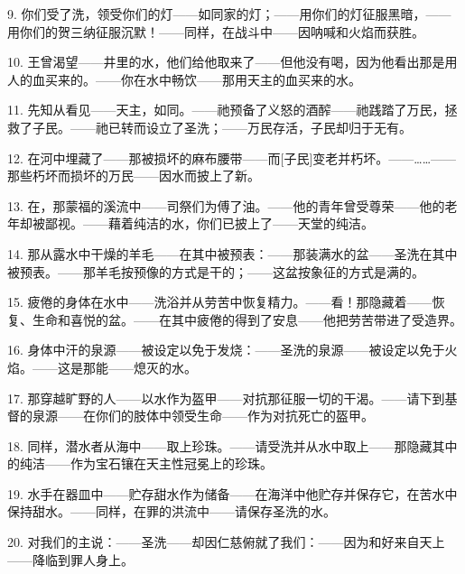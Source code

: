 9. 你们受了洗，领受你们的灯——如同家的灯；——用你们的灯征服黑暗，——用你们的贺三纳征服沉默！——同样，在战斗中——因呐喊和火焰而获胜。\par

10. 王曾渴望——井里的水，他们给他取来了——但他没有喝，因为他看出那是用人的血买来的。——你在水中畅饮——那用天主的血买来的水。\par

11. 先知从看见——天主，如同。——祂预备了义怒的酒醡——祂践踏了万民，拯救了子民。——祂已转而设立了圣洗；——万民存活，子民却归于无有。\par

12. 在河中埋藏了——那被损坏的麻布腰带——而[子民]变老并朽坏。——……——那些朽坏而损坏的万民——因水而披上了新。\par

13. 在，那蒙福的溪流中——司祭们为傅了油。——他的青年曾受尊荣——他的老年却被鄙视。——藉着纯洁的水，你们已披上了——天堂的纯洁。\par

14. 那从露水中干燥的羊毛——在其中被预表：——那装满水的盆——圣洗在其中被预表。——那羊毛按预像的方式是干的；——这盆按象征的方式是满的。\par

15. 疲倦的身体在水中——洗浴并从劳苦中恢复精力。——看！那隐藏着——恢复、生命和喜悦的盆。——在其中疲倦的得到了安息——他把劳苦带进了受造界。\par

16. 身体中汗的泉源——被设定以免于发烧：——圣洗的泉源——被设定以免于火焰。——这是那能——熄灭的水。\par

17. 那穿越旷野的人——以水作为盔甲——对抗那征服一切的干渴。——请下到基督的泉源——在你们的肢体中领受生命——作为对抗死亡的盔甲。\par

18. 同样，潜水者从海中——取上珍珠。——请受洗并从水中取上——那隐藏其中的纯洁——作为宝石镶在天主性冠冕上的珍珠。\par

19. 水手在器皿中——贮存甜水作为储备——在海洋中他贮存并保存它，在苦水中保持甜水。——同样，在罪的洪流中——请保存圣洗的水。\par

20. 对我们的主说：——圣洗——却因仁慈俯就了我们：——因为和好来自天上——降临到罪人身上。\par


